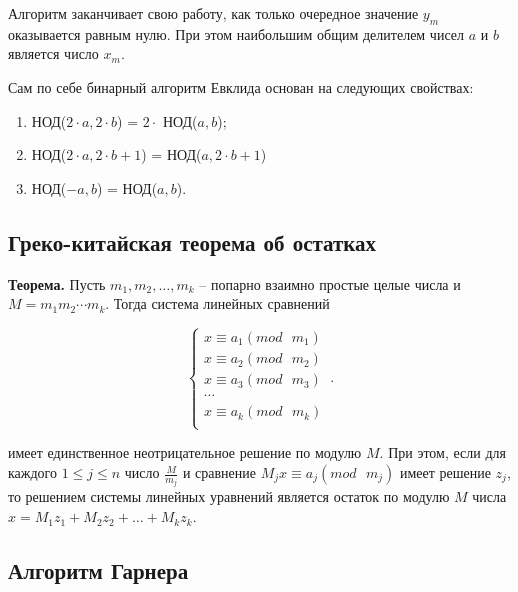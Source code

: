 \documentclass[bachelor, och, labwork]{shiza}
\begin{document}
        Алгоритм заканчивает свою работу, как только очередное значение
        $y_m$ оказывается равным нулю. При этом наибольшим общим делителем
        чисел $a$ и $b$ является число $x_m$.

        Сам по себе бинарный алгоритм Евклида основан на следующих свойствах:

        \begin{enumerate}
            \item НОД($2 \cdot a, 2 \cdot b$) = $2 \cdot$ НОД($a, b$);
            \item НОД($2 \cdot a, 2 \cdot b + 1$) = НОД($a, 2 \cdot b + 1$)
            \item НОД($-a, b$) = НОД($a, b$).
        \end{enumerate}


    \subsection{Греко-китайская теорема об остатках}

        \textbf{Теорема.} Пусть $m_1, m_2, \dots , m_k$ – попарно взаимно
        простые целые числа и $M = m_1m_2 \cdots m_k$. Тогда система линейных
        сравнений


        \begin{equation}
            \begin{cases}
                x \equiv a_1 (mod \text{ } m_1)\\
                x \equiv a_2 (mod \text{ } m_2)\\
                x \equiv a_3 (mod \text{ } m_3)\\
                \cdots\\
                x \equiv a_k (mod \text{ } m_k)\\              
            \end{cases}\,.
        \end{equation}
        
        имеет единственное неотрицательное решение по модулю $M$. При этом, если
        для каждого $1 \leq j \leq n$ число $\frac{M}{m_j}$ и сравнение $M_j x
        \equiv a_j (mod \text{ } m_j)$ имеет решение $z_j$, то решением системы
        линейных уравнений является остаток по модулю $M$ числа $x = M_1 z_1 +
        M_2 z_2 + \dots + M_k z_k$.

    \subsection{Алгоритм Гарнера}
\end{document}

